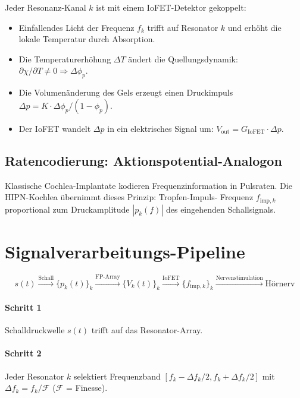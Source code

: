 ﻿\documentclass[a4paper,12pt]{scrreprt}
\theoremstyle{definition}
\begin{document}
Jeder Resonanz-Kanal $k$ ist mit einem IoFET-Detektor gekoppelt:
\begin{itemize}
  \item Einfallendes Licht der Frequenz $f_k$ trifft auf Resonator $k$
    und erhöht die lokale Temperatur durch Absorption.
  \item Die Temperaturerhöhung $\Delta T$ ändert die Quellungsdynamik:
    $\partial\chi/\partial T \neq 0 \Rightarrow \Delta\phi_p$.
  \item Die Volumenänderung des Gels erzeugt einen Druckimpuls
    $\Delta p = K \cdot \Delta\phi_p / (1-\phi_p)$.
  \item Der IoFET wandelt $\Delta p$ in ein elektrisches Signal um:
    $V_{\mathrm{out}} = G_{\mathrm{IoFET}} \cdot \Delta p$.
\end{itemize}

\subsection{Ratencodierung: Aktionspotential-Analogon}

Klassische Cochlea-Implantate kodieren Frequenzinformation in
Pulsraten. Die HIPN-Kochlea übernimmt dieses Prinzip: Tropfen-Impuls-
Frequenz $f_{\mathrm{imp},k}$ proportional zum Druckamplitude
$|p_k(f)|$ des eingehenden Schallsignals.

\section{Signalverarbeitungs-Pipeline}

\begin{equation}
  s(t) \xrightarrow{\text{Schall}} \{p_k(t)\}_k
  \xrightarrow{\text{FP-Array}} \{V_k(t)\}_k
  \xrightarrow{\text{IoFET}} \{f_{\mathrm{imp},k}\}_k
  \xrightarrow{\text{Nervenstimulation}} \text{Hörnerv}
\end{equation}

\paragraph{Schritt 1} Schalldruckwelle $s(t)$ trifft auf das Resonator-Array.

\paragraph{Schritt 2} Jeder Resonator $k$ selektiert Frequenzband
$[f_k - \Delta f_k/2, f_k + \Delta f_k/2]$ mit
$\Delta f_k = f_k / \mathcal{F}$ ($\mathcal{F}$ = Finesse).
\end{document}
